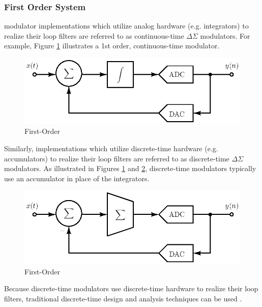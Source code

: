 \subsubsection{First Order System}
\DS modulator implementations which utilize analog hardware (e.g. integrators) to realize
their loop filters are referred to as continuous-time $\Delta\Sigma$ modulators. For
example, Figure \ref{fig:ct_first_order} illustrates a 1st order, continuous-time \DS
modulator.
\begin{figure}[htbp]
 \centering
 \includegraphics{./final_figures/ct_dsm_model.eps}
 \caption{First-Order \CTDSM}
 \label{fig:ct_first_order}
\end{figure}
Similarly, implementations which utilize discrete-time hardware (e.g. accumulators) to
realize their loop filters  are referred to as discrete-time $\Delta\Sigma$ modulators. As
illustrated in Figures \ref{fig:ct_first_order} and \ref{fig:dt_first_order},
discrete-time \DS modulators typically use an accumulator in place of the
integrators.
\begin{figure}[htbp]
 \centering
 \includegraphics{./final_figures/dt_dsm_model.eps}
 \caption{First-Order \DTDSM}
 \label{fig:dt_first_order}
\end{figure}
Because discrete-time \DS modulators use discrete-time hardware to realize their loop
filters, traditional discrete-time design and analysis techniques can be used
\cite{hayes_schaums_1998}\cite{cherry_continuous-time_1999}.

